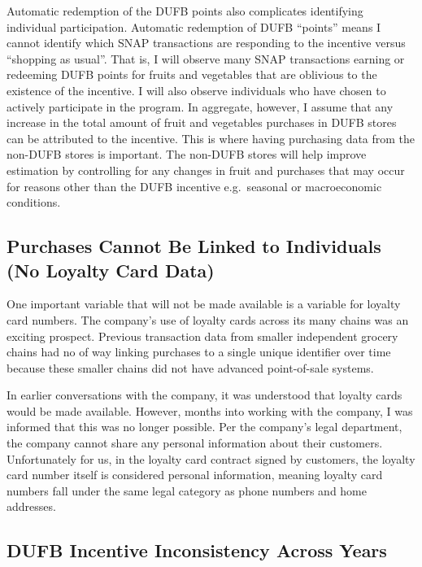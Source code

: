\documentclass[12pt,letterpaperpaper,]{book}
\begin{document}
Automatic redemption of the DUFB points also complicates identifying
individual participation. Automatic redemption of DUFB ``points'' means
I cannot identify which SNAP transactions are responding to the
incentive versus ``shopping as usual''. That is, I will observe many
SNAP transactions earning or redeeming DUFB points for fruits and
vegetables that are oblivious to the existence of the incentive. I will
also observe individuals who have chosen to actively participate in the
program. In aggregate, however, I assume that any increase in the total
amount of fruit and vegetables purchases in DUFB stores can be
attributed to the incentive. This is where having purchasing data from
the non-DUFB stores is important. The non-DUFB stores will help improve
estimation by controlling for any changes in fruit and purchases that
may occur for reasons other than the DUFB incentive e.g.~seasonal or
macroeconomic conditions.

\subsection*{Purchases Cannot Be Linked to Individuals (No Loyalty Card
Data)}\label{purchases-cannot-be-linked-to-individuals-no-loyalty-card-data}

One important variable that will not be made available is a variable for
loyalty card numbers. The company's use of loyalty cards across its many
chains was an exciting prospect. Previous transaction data from smaller
independent grocery chains had no of way linking purchases to a single
unique identifier over time because these smaller chains did not have
advanced point-of-sale systems.

In earlier conversations with the company, it was understood that
loyalty cards would be made available. However, months into working with
the company, I was informed that this was no longer possible. Per the
company's legal department, the company cannot share any personal
information about their customers. Unfortunately for us, in the loyalty
card contract signed by customers, the loyalty card number itself is
considered personal information, meaning loyalty card numbers fall under
the same legal category as phone numbers and home addresses.

\subsection*{DUFB Incentive Inconsistency Across
Years}\label{dufb-incentive-inconsistency-across-years}
\end{document}
